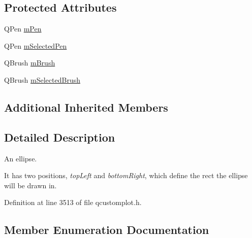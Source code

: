 \subsection*{Protected Attributes}
\begin{DoxyCompactItemize}
\item 
Q\+Pen \hyperlink{class_q_c_p_item_ellipse_a16ad9389acf028a7e4ac8fd7a550b2e4}{m\+Pen}
\item 
Q\+Pen \hyperlink{class_q_c_p_item_ellipse_a57b047abfce6f1a84ed46ca668c90e21}{m\+Selected\+Pen}
\item 
Q\+Brush \hyperlink{class_q_c_p_item_ellipse_a6fa59478cd3ad1b10e6c1f6cedc84bd6}{m\+Brush}
\item 
Q\+Brush \hyperlink{class_q_c_p_item_ellipse_a2e49d5547478aa36910ed8a2dcc8a5c0}{m\+Selected\+Brush}
\end{DoxyCompactItemize}
\subsection*{Additional Inherited Members}


\subsection{Detailed Description}
An ellipse. 

 It has two positions, {\itshape top\+Left} and {\itshape bottom\+Right}, which define the rect the ellipse will be drawn in. 

Definition at line 3513 of file qcustomplot.\+h.



\subsection{Member Enumeration Documentation}
\hypertarget{class_q_c_p_item_ellipse_a415009889543169f35b70795f415e45e}{}
